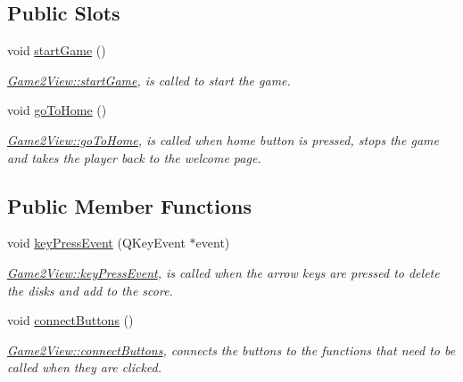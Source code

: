 \subsection*{Public Slots}
\begin{DoxyCompactItemize}
\item 
\mbox{\label{classGame2View_a0b81a7c2cb3223cd92d994e0909719c9}} 
void \hyperlink{classGame2View_a0b81a7c2cb3223cd92d994e0909719c9}{start\+Game} ()
\begin{DoxyCompactList}\small\item\em \hyperlink{classGame2View_a0b81a7c2cb3223cd92d994e0909719c9}{Game2\+View\+::start\+Game}, is called to start the game. \end{DoxyCompactList}\item 
\mbox{\label{classGame2View_a18957227e6e08549506c1f5e6628e71b}} 
void \hyperlink{classGame2View_a18957227e6e08549506c1f5e6628e71b}{go\+To\+Home} ()
\begin{DoxyCompactList}\small\item\em \hyperlink{classGame2View_a18957227e6e08549506c1f5e6628e71b}{Game2\+View\+::go\+To\+Home}, is called when home button is pressed, stops the game and takes the player back to the welcome page. \end{DoxyCompactList}\end{DoxyCompactItemize}
\subsection*{Public Member Functions}
\begin{DoxyCompactItemize}
\item 
\mbox{\label{classGame2View_a14ea90578ed2a2ee3a4938dd4ca2c648}} 
void \hyperlink{classGame2View_a14ea90578ed2a2ee3a4938dd4ca2c648}{key\+Press\+Event} (Q\+Key\+Event $\ast$event)
\begin{DoxyCompactList}\small\item\em \hyperlink{classGame2View_a14ea90578ed2a2ee3a4938dd4ca2c648}{Game2\+View\+::key\+Press\+Event}, is called when the arrow keys are pressed to delete the disks and add to the score. \end{DoxyCompactList}\item 
\mbox{\label{classGame2View_a9ba086e311faddeed6a28cf9e727719c}} 
void \hyperlink{classGame2View_a9ba086e311faddeed6a28cf9e727719c}{connect\+Buttons} ()
\begin{DoxyCompactList}\small\item\em \hyperlink{classGame2View_a9ba086e311faddeed6a28cf9e727719c}{Game2\+View\+::connect\+Buttons}, connects the buttons to the functions that need to be called when they are clicked. \end{DoxyCompactList}\end{DoxyCompactItemize}
